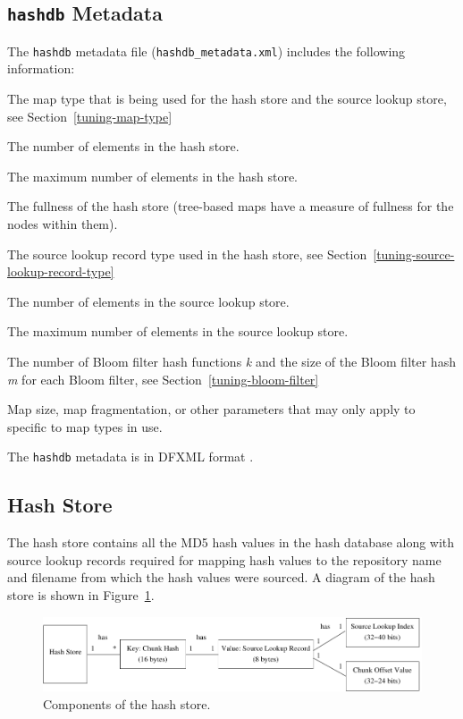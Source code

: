\documentclass[10pt,twoside]{article}
\newcommand{\hdb}{\texttt{hashdb}\xspace}
\begin{document}
\subsection{\hdb Metadata\label{hashdb-metadata}}
The \hdb metadata file (\texttt{hashdb\_metadata.xml}) includes the following information:
\begin{compactitem}
\item The map type that is being used for the hash store and the source lookup store,
      see Section~\ref{tuning-map-type}
\item The number of elements in the hash store.
\item The maximum number of elements in the hash store.
\item The fullness of the hash store (tree-based maps
have a measure of fullness for the nodes within them).
\item The source lookup record type used in the hash store,
see Section~\ref{tuning-source-lookup-record-type}
\item The number of elements in the source lookup store.
\item The maximum number of elements in the source lookup store.
\item The number of Bloom filter hash functions \emph{k}
and the size of the Bloom filter hash \emph{m} for each Bloom filter,
see Section~\ref{tuning-bloom-filter}
\item Map size, map fragmentation, or other parameters
that may only apply to specific to map types in use.
\end{compactitem}
The \hdb metadata is in DFXML format \cite{dfxml}.

\subsection{Hash Store}
The hash store contains all the MD5 hash values in the hash database
along with source lookup records required for mapping hash values
to the repository name and filename from which the hash values were sourced.
A diagram of the hash store is shown in Figure~\ref{fig-hash-store}.

\begin{figure}[h]
  \center
  \includegraphics{images/hash_store}
  \caption{Components of the hash store.\label{fig-hash-store}}
\end{figure}
\end{document}
